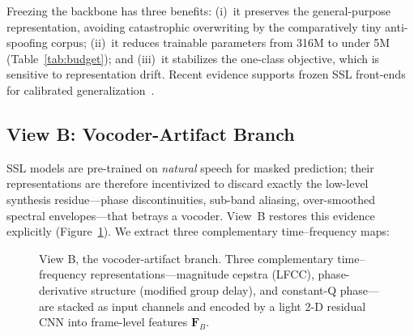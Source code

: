 Freezing the backbone has three benefits: (i)~it preserves the general-purpose
representation, avoiding catastrophic overwriting by the comparatively tiny
anti-spoofing corpus; (ii)~it reduces trainable parameters from 316M to under 5M
(Table~\ref{tab:budget}); and (iii)~it stabilizes the one-class objective, which is
sensitive to representation drift. Recent evidence supports frozen SSL front-ends for
calibrated generalization~\cite{pascu2024calibrated}.

\subsection{View B: Vocoder-Artifact Branch}
\label{ssec:viewb}

SSL models are pre-trained on \emph{natural} speech for masked prediction; their
representations are therefore incentivized to discard exactly the low-level synthesis
residue---phase discontinuities, sub-band aliasing, over-smoothed spectral
envelopes---that betrays a vocoder. View~B restores this evidence explicitly
(Figure~\ref{fig:artifact}). We extract three complementary time--frequency maps:

\begin{figure}[t]
\centering
{}
\caption{View B, the vocoder-artifact branch. Three complementary time--frequency
representations---magnitude cepstra (LFCC), phase-derivative structure (modified group
delay), and constant-Q phase---are stacked as input channels and encoded by a light 2-D
residual CNN into frame-level features $\mathbf{F}_B$.}
\label{fig:artifact}
\end{figure}

